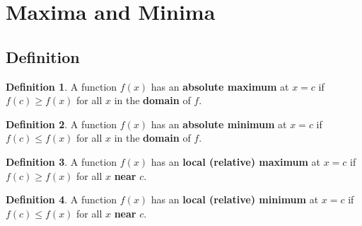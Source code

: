 \documentclass[t]{beamer}
\theoremstyle{plain}
\theoremstyle{definition}
\newtheorem{dfn}{Definition}
\begin{document}
\section{Maxima and Minima}

\subsection{Definition}
\begin{frame}

\begin{dfn}
A function $f(x)$ has an \textbf{absolute maximum} at $x=c$ if $f(c) \geq f(x)$ for all $x$ in the \textbf{domain} of $f$.
\end{dfn}

\begin{dfn}
A function $f(x)$ has an \textbf{absolute minimum} at $x=c$ if $f(c) \leq f(x)$ for all $x$ in the \textbf{domain} of $f$.
\end{dfn}

\begin{dfn}
A function $f(x)$ has an \textbf{local (relative) maximum} at $x=c$ if $f(c) \geq f(x)$ for all $x$ \textbf{near} $c$.
\end{dfn}

\begin{dfn}
A function $f(x)$ has an \textbf{local (relative) minimum} at $x=c$ if $f(c) \leq f(x)$ for all $x$ \textbf{near} $c$.
\end{dfn}

\end{frame}
\end{document}
